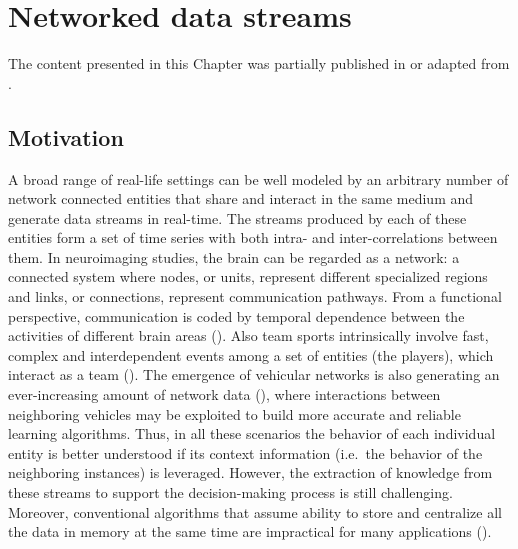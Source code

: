
\chapter{Networked data streams}


\label{chp:networked_data_streams}



\begin{tcolorbox}
	\small{
		The content presented in this Chapter was partially published in or adapted from \cite{SpaMHMM, SOHMMM}.
	}
\end{tcolorbox}

\section{Motivation}
\label{sec:chp1_motivation}
A broad range of real-life settings can be well modeled by an arbitrary number of network connected entities that share and interact in the same medium and generate data streams in real-time. The streams produced by each of these entities form a set of time series with both intra- and inter-correlations between them. In neuroimaging studies, the brain can be regarded as a network: a connected system where nodes, or units, represent different specialized regions and links, or connections, represent communication pathways. From a functional perspective, communication is coded by temporal dependence between the activities of different brain areas (\citet{DeVicoFallani20130521}). Also team sports intrinsically involve fast, complex and interdependent events among a set of entities (the players), which interact as a team (\citet{Tora2017, Theagarajan2018}). The emergence of vehicular networks is also generating an ever-increasing amount of network data (\citet{Cheng2018}), where interactions between neighboring vehicles may be exploited to build more accurate and reliable learning algorithms. Thus, in all these scenarios the behavior of each individual entity is better understood if its context information (i.e.\ the behavior of the neighboring instances) is leveraged. However, the extraction of knowledge from these streams to support the decision-making process is still challenging. Moreover, conventional algorithms that assume ability to store and centralize all the data in memory at the same time are impractical for many applications (\citet{Gama2007}).

